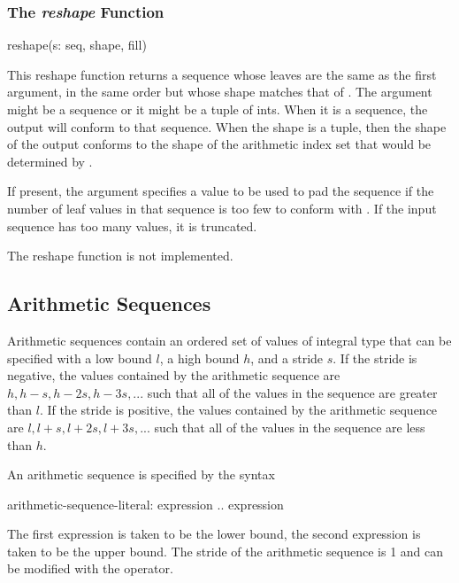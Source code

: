 \subsubsection{The {\em reshape} Function}
\label{The_em_reshape_Function}

\begin{chapel}
reshape(s: seq, shape, fill)
\end{chapel}

This reshape function returns a sequence whose leaves are the same as
the first argument, in the same order but whose shape matches that
of . The  argument might be a sequence or it
might be a tuple of ints. When it is a sequence, the output will
conform to that sequence. When the shape is a tuple, then the shape of
the output conforms to the shape of the arithmetic index set that
would be determined by .

If present, the  argument specifies a value to be used to
pad the sequence if the number of leaf values in that sequence is too
few to conform with . If the input sequence has too many
values, it is truncated.

\begin{implementation}
The reshape function is not implemented.
\end{implementation}

\subsection{Arithmetic Sequences}
\label{Arithmetic_Sequences}
Arithmetic sequences contain an ordered set of values of integral type
that can be specified with a low bound $l$, a high bound $h$, and a
stride $s$.  If the stride is negative, the values contained by the
arithmetic sequence are $h, h-s, h-2s, h-3s, ...$ such that all of the
values in the sequence are greater than $l$.  If the stride is
positive, the values contained by the arithmetic sequence are $l, l+s,
l+2s, l+3s, ...$ such that all of the values in the sequence are
less than $h$.

An arithmetic sequence is specified by the syntax
\begin{syntax}
arithmetic-sequence-literal:
  expression .. expression
\end{syntax}
The first expression is taken to be the lower bound, the second
expression is taken to be the upper bound.  The stride of the
arithmetic sequence is 1 and can be modified with the 
operator.

